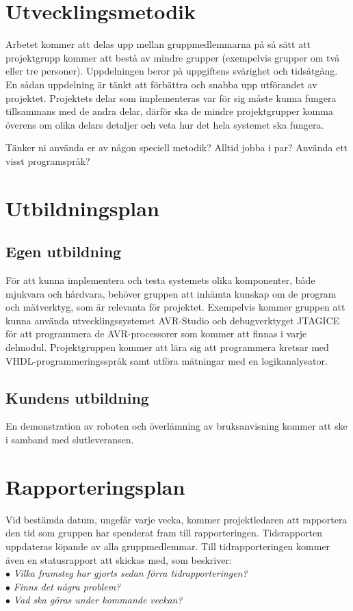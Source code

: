 \documentclass[11pt]{article}
\begin{document}
\begin{flushleft}
\begin{center}
\begin{longtable}{|p{.28\linewidth}|p{.1\linewidth}|p{.25\linewidth}|p{.19\linewidth}|p{.15\linewidth}|}
\end{longtable}
\end{center}
\pagebreak

\section{Utvecklingsmetodik}
Arbetet kommer att delas upp mellan gruppmedlemmarna på så sätt att projektgrupp kommer att bestå av mindre grupper (exempelvis grupper om två eller tre personer). Uppdelningen beror på uppgiftens svårighet och tidsåtgång. En sådan uppdelning är tänkt att förbättra och snabba upp utförandet av projektet. Projektets delar som implementeras var för sig måste kunna fungera tillsammans med de andra delar, därför ska de mindre projektgrupper komma överens om olika delars detaljer och veta hur det hela systemet ska fungera.


Tänker ni använda er av någon speciell metodik?
Alltid jobba i par? Använda ett visst
programspråk?


\section{Utbildningsplan}


\subsection{Egen utbildning}
För att kunna implementera och testa systemets olika komponenter, både mjukvara och hårdvara, behöver gruppen att inhämta kunskap om de program och mätverktyg, som är relevanta för projektet. Exempelvis kommer gruppen att kunna använda utvecklingssystemet AVR-Studio och debugverktyget JTAGICE för att programmera de AVR-processorer som kommer att finnas i varje delmodul. Projektgruppen kommer att lära sig att programmera kretsar med VHDL-programmeringsspråk samt utföra mätningar med en logikanalysator.

\subsection{Kundens utbildning}
En demonstration av roboten och överlämning av bruksanvisning kommer att ske i samband med slutleveransen.

\pagebreak

\section{Rapporteringsplan}
Vid bestämda datum, ungefär varje vecka, kommer projektledaren att rapportera den tid som gruppen har spenderat fram till rapporteringen. Tidsrapporten uppdateras löpande av alla gruppmedlemmar. Till tidrapporteringen kommer även en statusrapport att skickas med, som beskriver:\\
$\bullet$ \textit{Vilka framsteg har gjorts sedan förra tidrapporteringen?}\\
$\bullet$ \textit{Finns det några problem?}\\ 
$\bullet$ \textit{Vad ska göras under kommande veckan?}



\end{flushleft}
\end{document}

